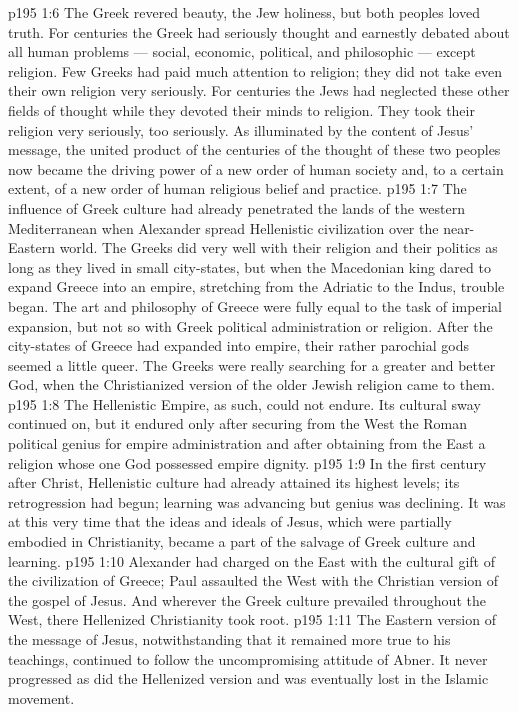 \vs p195 1:6 The Greek revered beauty, the Jew holiness, but both peoples loved truth. For centuries the Greek had seriously thought and earnestly debated about all human problems --- social, economic, political, and philosophic --- except religion. Few Greeks had paid much attention to religion; they did not take even their own religion very seriously. For centuries the Jews had neglected these other fields of thought while they devoted their minds to religion. They took their religion very seriously, too seriously. As illuminated by the content of Jesus’ message, the united product of the centuries of the thought of these two peoples now became the driving power of a new order of human society and, to a certain extent, of a new order of human religious belief and practice.
\vs p195 1:7 \pc The influence of Greek culture had already penetrated the lands of the western Mediterranean when Alexander spread Hellenistic civilization over the near\hyp{}Eastern world. The Greeks did very well with their religion and their politics as long as they lived in small city\hyp{}states, but when the Macedonian king dared to expand Greece into an empire, stretching from the Adriatic to the Indus, trouble began. The art and philosophy of Greece were fully equal to the task of imperial expansion, but not so with Greek political administration or religion. After the city\hyp{}states of Greece had expanded into empire, their rather parochial gods seemed a little queer. The Greeks were really searching for  a greater and better God, when the Christianized version of the older Jewish religion came to them.
\vs p195 1:8 The Hellenistic Empire, as such, could not endure. Its cultural sway continued on, but it endured only after securing from the West the Roman political genius for empire administration and after obtaining from the East a religion whose one God possessed empire dignity.
\vs p195 1:9 In the first century after Christ, Hellenistic culture had already attained its highest levels; its retrogression had begun; learning was advancing but genius was declining. It was at this very time that the ideas and ideals of Jesus, which were partially embodied in Christianity, became a part of the salvage of Greek culture and learning.
\vs p195 1:10 Alexander had charged on the East with the cultural gift of the civilization of Greece; Paul assaulted the West with the Christian version of the gospel of Jesus. And wherever the Greek culture prevailed throughout the West, there Hellenized Christianity took root.
\vs p195 1:11 \pc The Eastern version of the message of Jesus, notwithstanding that it remained more true to his teachings, continued to follow the uncompromising attitude of Abner. It never progressed as did the Hellenized version and was eventually lost in the Islamic movement.
